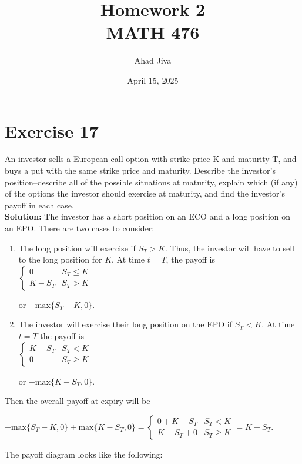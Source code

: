 \documentclass{article}
\title{Homework 2 \\ \large MATH 476}
\author{Ahad Jiva}
\date{April 15, 2025}
\begin{document}
\maketitle
\section*{Exercise 17} 

An investor sells a European call option with strike price K and maturity T, and buys a put with
the same strike price and maturity. Describe the investor’s position–describe all of the possible situations at
maturity, explain which (if any) of the options the investor should exercise at maturity, and find the investor’s
payoff in each case. \\

\textbf{Solution:}
The investor has a short position on an ECO and a long position on an EPO. There are two cases to consider:
\begin{enumerate}
    \item The long position will exercise if $S_T > K$. Thus, the investor will have to sell to the long position for $K$. At time $t=T$, the payoff is \\
    
    $\begin{cases}
        0 & S_T \leq K \\
        K - S_T & S_T > K
    \end{cases}$

    or $-\text{max}\{S_T-K, 0\}$.

    \item The investor will exercise their long position on the EPO if $S_T < K$. At time $t=T$ the payoff is \\
    
    $\begin{cases}
        K-S_T & S_T < K \\
        0 & S_T \geq K
    \end{cases}$

    or $-\text{max}\{K-S_T, 0\}$.
\end{enumerate}
Then the overall payoff at expiry will be 
\begin{center}
    $-\text{max}\{S_T-K, 0\} + \text{max}\{K-S_T, 0\} = 
    \begin{cases}
        0 + K - S_T & S_T < K \\
        K - S_T + 0 & S_T \geq K
    \end{cases}
    = K - S_T$.
\end{center}
The payoff diagram looks like the following: \\
\end{document}
